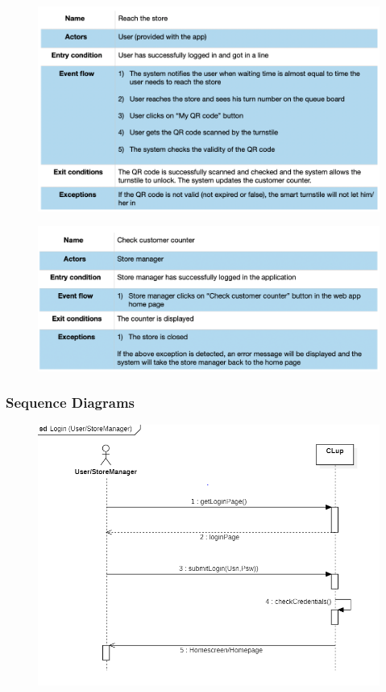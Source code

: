 \documentclass{article}
\begin{document}
\begin{figure}[H]
  \includegraphics[width=\linewidth]{ReachStoreUseCase.png}
  
\end{figure}

\begin{figure}[H]
  \includegraphics[width=\linewidth]{CheckCustomerCounterUseCase.png}
  
\end{figure}

\subsubsection{Sequence Diagrams}

\begin{figure}[H]
  \includegraphics[width=\linewidth]{LoginSequence.png}
  
\end{figure}
\end{document}
